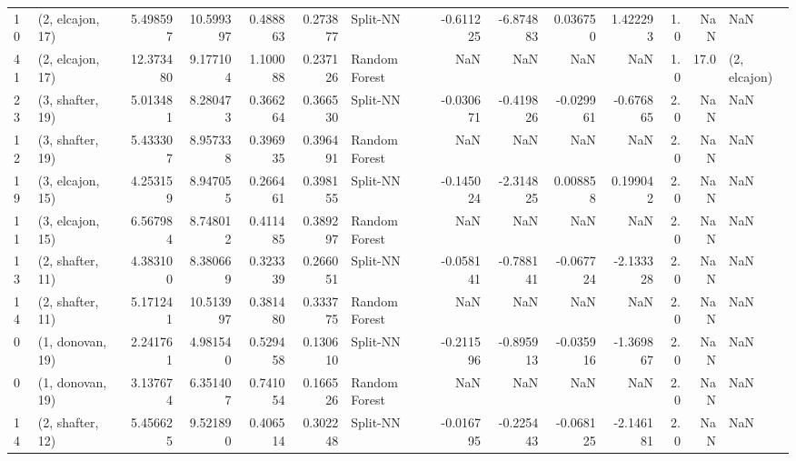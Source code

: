 \begin{tabular}{llrrrrlrrrrrrl}
10 &  (2, elcajon, 17) &   5.498597 &  10.599397 &   0.488863 &  0.273877 &       Split-NN &       -0.611225 &     -6.874883 &       0.036750 &     1.422293 &            1.0 &    NaN &              NaN \\
41 &  (2, elcajon, 17) &  12.373480 &   9.177104 &   1.100088 &  0.237126 &  Random Forest &             NaN &           NaN &            NaN &          NaN &            1.0 &   17.0 &     (2, elcajon) \\
23 &  (3, shafter, 19) &   5.013481 &   8.280473 &   0.366264 &  0.366530 &       Split-NN &       -0.030671 &     -0.419826 &      -0.029961 &    -0.676865 &            2.0 &    NaN &              NaN \\
12 &  (3, shafter, 19) &   5.433307 &   8.957338 &   0.396935 &  0.396491 &  Random Forest &             NaN &           NaN &            NaN &          NaN &            2.0 &    NaN &              NaN \\
19 &  (3, elcajon, 15) &   4.253159 &   8.947055 &   0.266461 &  0.398155 &       Split-NN &       -0.145024 &     -2.314825 &       0.008858 &     0.199042 &            2.0 &    NaN &              NaN \\
11 &  (3, elcajon, 15) &   6.567984 &   8.748012 &   0.411485 &  0.389297 &  Random Forest &             NaN &           NaN &            NaN &          NaN &            2.0 &    NaN &              NaN \\
13 &  (2, shafter, 11) &   4.383100 &   8.380669 &   0.323339 &  0.266051 &       Split-NN &       -0.058141 &     -0.788141 &      -0.067724 &    -2.133328 &            2.0 &    NaN &              NaN \\
14 &  (2, shafter, 11) &   5.171241 &  10.513997 &   0.381480 &  0.333775 &  Random Forest &             NaN &           NaN &            NaN &          NaN &            2.0 &    NaN &              NaN \\
0  &  (1, donovan, 19) &   2.241761 &   4.981540 &   0.529458 &  0.130610 &       Split-NN &       -0.211596 &     -0.895913 &      -0.035916 &    -1.369867 &            2.0 &    NaN &              NaN \\
0  &  (1, donovan, 19) &   3.137674 &   6.351407 &   0.741054 &  0.166526 &  Random Forest &             NaN &           NaN &            NaN &          NaN &            2.0 &    NaN &              NaN \\
14 &  (2, shafter, 12) &   5.456625 &   9.521890 &   0.406514 &  0.302248 &       Split-NN &       -0.016795 &     -0.225443 &      -0.068125 &    -2.146181 &            2.0 &    NaN &              NaN \\

\end{tabular}
